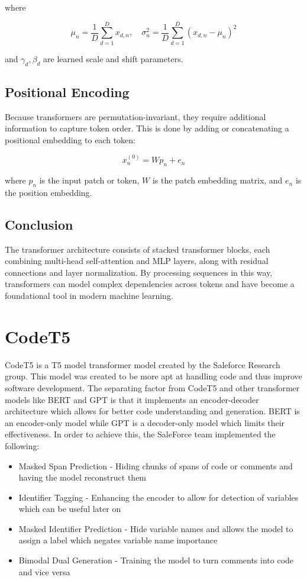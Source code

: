 \documentclass{article}
\begin{document}
where

\[
\mu_n = \frac{1}{D} \sum_{d=1}^D x_{d,n}, \quad \sigma_n^2 = \frac{1}{D} \sum_{d=1}^D (x_{d,n} - \mu_n)^2
\]

and \( \gamma_d, \beta_d \) are learned scale and shift parameters.

\subsection{Positional Encoding}

Because transformers are permutation-invariant, they require additional information to capture token order. This is done by adding or concatenating a positional embedding to each token:

\[
x_n^{(0)} = W p_n + e_n
\]

where \( p_n \) is the input patch or token, \( W \) is the patch embedding matrix, and \( e_n \) is the position embedding. \cite{turner2024introductiontransformers}

\subsection{Conclusion}

The transformer architecture consists of stacked transformer blocks, each combining multi-head self-attention and MLP layers, along with residual connections and layer normalization. By processing sequences in this way, transformers can model complex dependencies across tokens and have become a foundational tool in modern machine learning.

\section{CodeT5}
CodeT5 is a T5 model transformer model created by the Saleforce Research group. This model was created to be more apt at handling code and thus improve software development. The separating factor from CodeT5 and other transformer models like BERT and GPT is that it implements an encoder-decoder architecture which allows for better code understanding and generation. BERT is an encoder-only model while GPT is a decoder-only model which limits their effectiveness. In order to achieve this, the SaleForce team implemented the following:

\begin{itemize}
\item Masked Span Prediction - Hiding chunks of spans of code or comments and having the model reconstruct them 
\item Identifier Tagging - Enhancing the encoder to allow for detection of variables which can be useful later on
\item Masked Identifier Prediction - Hide variable names and allows the model to assign a label which negates variable name importance
\item Bimodal Dual Generation - Training the model to turn comments into code and vice versa
\end{itemize}
\end{document}
